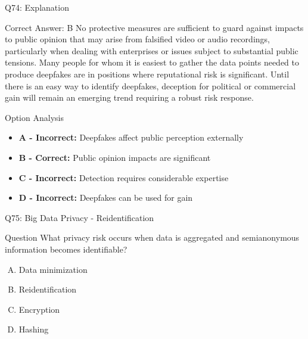 \documentclass{beamer}
\begin{document}
	\begin{frame}{Q74: Explanation}
		\begin{block}{Correct Answer: B}
			No protective measures are sufficient to guard against impacts to public opinion that may arise from falsified video or audio recordings, particularly when dealing with enterprises or issues subject to substantial public tensions. Many people for whom it is easiest to gather the data points needed to produce deepfakes are in positions where reputational risk is significant. Until there is an easy way to identify deepfakes, deception for political or commercial gain will remain an emerging trend requiring a robust risk response.
		\end{block}
		\begin{block}{Option Analysis}
			\begin{itemize}
				\item \textbf{A - Incorrect:} Deepfakes affect public perception externally
				\item \textbf{B - Correct:} Public opinion impacts are significant
				\item \textbf{C - Incorrect:} Detection requires considerable expertise
				\item \textbf{D - Incorrect:} Deepfakes can be used for gain
			\end{itemize}
		\end{block}
	\end{frame}
	
	\begin{frame}{Q75: Big Data Privacy - Reidentification}
		\begin{block}{Question}
			What privacy risk occurs when data is aggregated and semianonymous information becomes identifiable?
		\end{block}
		\begin{enumerate}[(A)]
			\item Data minimization
			\item Reidentification
			\item Encryption
			\item Hashing
		\end{enumerate}
	\end{frame}
	
\end{document}
